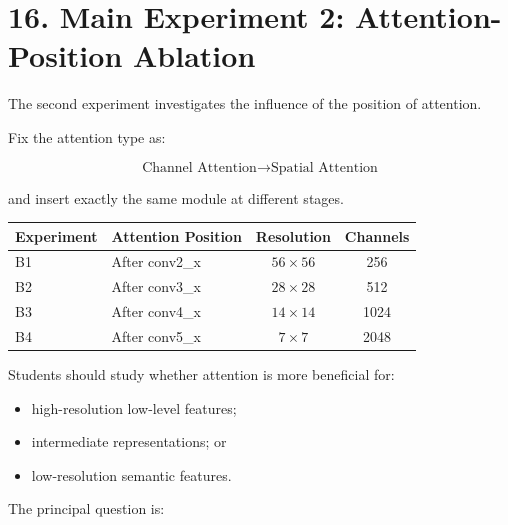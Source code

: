 \documentclass[10pt]{article}
\begin{document}
\section*{16. Main Experiment 2: Attention-Position Ablation}

The second experiment investigates the influence of the position of
attention.

Fix the attention type as:

\[
\boxed{
\text{Channel Attention}
\rightarrow
\text{Spatial Attention}
}
\]

and insert exactly the same module at different stages.

\begin{center}

\begin{tabular}{|l|l|c|c|}
\hline

\textbf{Experiment}
&
\textbf{Attention Position}
&
\textbf{Resolution}
&
\textbf{Channels}
\\
\hline

B1
&
After conv2\_x
&
$56\times56$
&
256
\\
\hline

B2
&
After conv3\_x
&
$28\times28$
&
512
\\
\hline

B3
&
After conv4\_x
&
$14\times14$
&
1024
\\
\hline

B4
&
After conv5\_x
&
$7\times7$
&
2048
\\
\hline

\end{tabular}

\end{center}

Students should study whether attention is more beneficial for:

\begin{itemize}

\item high-resolution low-level features;

\item intermediate representations; or

\item low-resolution semantic features.

\end{itemize}

The principal question is:
\end{document}
